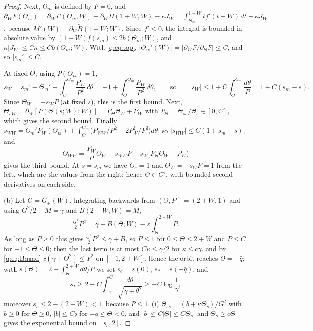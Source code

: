 \documentclass[11pt]{amsart}
\theoremstyle{definition}
\theoremstyle{remark}
\begin{document}
\begin{proof}
Next, $\Theta_m$ is defined by $F=0$, and
$\partial_WF(\Theta_m)=\partial_W\tilde B(\Theta_m;W)-\partial_W\tilde B(1+W;W)-\kappa J_W
=\int_{\Theta_m}^{1+W}tf'(t-W)\,dt-\kappa J_W$, because $M'(W)=\partial_W\tilde B(1+W;W)$. Since
$f'\le0$, the integral is bounded in absolute value by $(1+W)f(s_m)\le2b(\Theta_m;W)$, and
$\kappa|J_W|\le C\kappa\le Cb(\Theta_m;W)$. With \eqref{q:eq:top},
$|\Theta_m'(W)|=|\partial_WF/\partial_\Theta F|\le C$, and so $|s_m'|\le C$.

At fixed $\Theta$, using $P(\Theta_m)=1$,
\[
s_W=s_m'-\Theta_m'+\int_\Theta^{\Theta_m}\frac{P_W}{P^2}\,d\theta
=-1+\int_\Theta^{\Theta_m}\frac{P_W}{P^2}\,d\theta,\qquad\text{so}\qquad
|s_W|\le1+C\int_\Theta^{\Theta_m}\frac{d\theta}P=1+C(s_m-s).
\]
Since $\Theta_W=-s_WP$ (at fixed $s$), this is the first bound. Next,
$\Theta_{sW}=\partial_W[P(\Theta(s;W);W)]=P_\Theta\Theta_W+P_W$ with
$P_\Theta=\Theta_{ss}/\Theta_s\in[0,C]$, which gives the second bound. Finally
$s_{WW}=\Theta_m'P_W(\Theta_m)+\int_\Theta^{\Theta_m}\big(P_{WW}/P^2-2P_W^2/P^3\big)d\theta$, so
$|s_{WW}|\le C(1+s_m-s)$, and
\[
\Theta_{WW}=\frac{P_W}P\Theta_W-s_{WW}P-s_W\big(P_\Theta\Theta_W+P_W\big)
\]
gives the third bound. At $s=s_m$ we have $\Theta_s=1$ and $\Theta_W=-s_WP=1$ from the
left, which are the values from the right; hence $\Theta\in C^1$, with bounded second
derivatives on each side.

\smallskip
(b) Let $G=G_+(W)$. Integrating backwards from $(\Theta,P)=(2+W,1)$ and using
$G^2/2-M=\gamma$ and $\tilde B(2+W;W)=M$,
\begin{equation}\label{q:eq:Psub}
\tfrac{G^2}2P^2=\gamma+\tilde B(\Theta;W)-\kappa\int_\Theta^{2+W}P .
\end{equation}
As long as $P\ge0$ this gives $\frac{G^2}2P^2\le\gamma+\tilde B$, so $P\le1$ for
$0\le\Theta\le2+W$ and $P\le C$ for $-1\le\Theta\le0$; then the last term is at most
$C\kappa\le\gamma/2$ for $\kappa\le c\gamma$, and by \eqref{q:eq:Bquad}
$c(\gamma+\Theta^2)\le P^2$ on $[-1,2+W]$. Hence the orbit reaches $\Theta=-\bar q$; with
$s(\Theta)=2-\int_\Theta^{2+W}d\theta/P$ we set $s_c=s(0)$, $s_*=s(-\bar q)$, and
\[
s_*\ge2-C\int_{-1}^{C}\frac{d\theta}{\sqrt{\gamma+\theta^2}}\ge-C\log\frac1\gamma ;
\]
moreover $s_c\le2-(2+W)<1$, because $P\le1$.
(i) $\Theta_{ss}=(b+\kappa\Theta_s)/G^2$ with $b\ge0$ for $\Theta\ge0$, $|b|\le C\bar q$ for
$-\bar q\le\Theta<0$, and $|b|\le C|\Theta|\le C\Theta_s$; and $\Theta_s\ge c\Theta$ gives the
exponential bound on $[s_c,2]$.


\end{proof}
\end{document}
